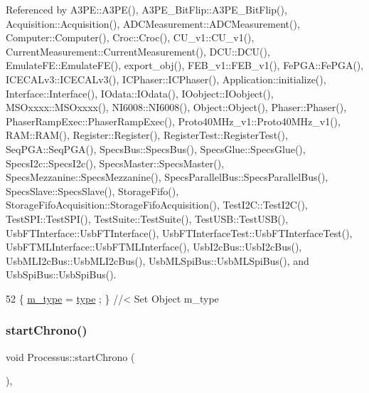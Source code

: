 Referenced by A3\+P\+E\+::\+A3\+P\+E(), A3\+P\+E\+\_\+\+Bit\+Flip\+::\+A3\+P\+E\+\_\+\+Bit\+Flip(), Acquisition\+::\+Acquisition(), A\+D\+C\+Measurement\+::\+A\+D\+C\+Measurement(), Computer\+::\+Computer(), Croc\+::\+Croc(), C\+U\+\_\+v1\+::\+C\+U\+\_\+v1(), Current\+Measurement\+::\+Current\+Measurement(), D\+C\+U\+::\+D\+C\+U(), Emulate\+F\+E\+::\+Emulate\+F\+E(), export\+\_\+obj(), F\+E\+B\+\_\+v1\+::\+F\+E\+B\+\_\+v1(), Fe\+P\+G\+A\+::\+Fe\+P\+G\+A(), I\+C\+E\+C\+A\+Lv3\+::\+I\+C\+E\+C\+A\+Lv3(), I\+C\+Phaser\+::\+I\+C\+Phaser(), Application\+::initialize(), Interface\+::\+Interface(), I\+Odata\+::\+I\+Odata(), I\+Oobject\+::\+I\+Oobject(), M\+S\+Oxxxx\+::\+M\+S\+Oxxxx(), N\+I6008\+::\+N\+I6008(), Object\+::\+Object(), Phaser\+::\+Phaser(), Phaser\+Ramp\+Exec\+::\+Phaser\+Ramp\+Exec(), Proto40\+M\+Hz\+\_\+v1\+::\+Proto40\+M\+Hz\+\_\+v1(), R\+A\+M\+::\+R\+A\+M(), Register\+::\+Register(), Register\+Test\+::\+Register\+Test(), Seq\+P\+G\+A\+::\+Seq\+P\+G\+A(), Specs\+Bus\+::\+Specs\+Bus(), Specs\+Glue\+::\+Specs\+Glue(), Specs\+I2c\+::\+Specs\+I2c(), Specs\+Master\+::\+Specs\+Master(), Specs\+Mezzanine\+::\+Specs\+Mezzanine(), Specs\+Parallel\+Bus\+::\+Specs\+Parallel\+Bus(), Specs\+Slave\+::\+Specs\+Slave(), Storage\+Fifo(), Storage\+Fifo\+Acquisition\+::\+Storage\+Fifo\+Acquisition(), Test\+I2\+C\+::\+Test\+I2\+C(), Test\+S\+P\+I\+::\+Test\+S\+P\+I(), Test\+Suite\+::\+Test\+Suite(), Test\+U\+S\+B\+::\+Test\+U\+S\+B(), Usb\+F\+T\+Interface\+::\+Usb\+F\+T\+Interface(), Usb\+F\+T\+Interface\+Test\+::\+Usb\+F\+T\+Interface\+Test(), Usb\+F\+T\+M\+L\+Interface\+::\+Usb\+F\+T\+M\+L\+Interface(), Usb\+I2c\+Bus\+::\+Usb\+I2c\+Bus(), Usb\+M\+L\+I2c\+Bus\+::\+Usb\+M\+L\+I2c\+Bus(), Usb\+M\+L\+Spi\+Bus\+::\+Usb\+M\+L\+Spi\+Bus(), and Usb\+Spi\+Bus\+::\+Usb\+Spi\+Bus().


\begin{DoxyCode}
52 \{ \hyperlink{classObject_a457a600fe8c00eb1034374f75110a78c}{m\_type}  = \hyperlink{classObject_a84f99f70f144a83e1582d1d0f84e4e62}{type}  ; \} \textcolor{comment}{//< Set Object m\_type}
\end{DoxyCode}
\mbox{\label{classProcessus_a5e4d34b86241fa0756e07375a14ff4b2}} 
\subsubsection{\texorpdfstring{start\+Chrono()}{startChrono()}}
{\footnotesize\ttfamily void Processus\+::start\+Chrono (\begin{DoxyParamCaption}{ }\end{DoxyParamCaption})\hspace{0.3cm}{\ttfamily [inline]}, {\ttfamily [inherited]}}

